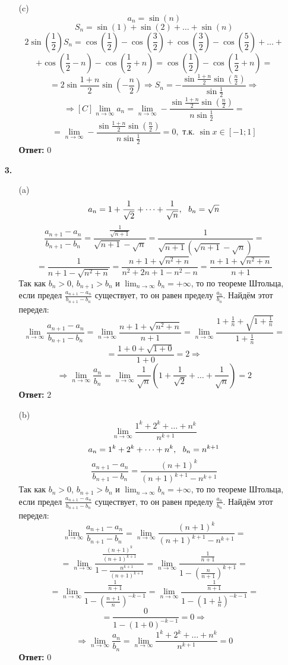 \documentclass[a4paper]{article}
\renewcommand{\f}[2]{\frac{#1}{#2}}
\newcommand{\ts}{\text{\space}}
\renewcommand{\r}{\Rightarrow}
\begin{document}
\begin{enumerate}
\begin{enumerate}
        \item[(c)]
        $$a_n = \sin(n)$$
        $$S_n = \sin(1) + \sin(2) + \dots + \sin(n)$$
        $$2\sin(\f{1}{2})S_n = \cos(\f{1}{2}) - \cos(\f{3}{2})+\cos(\f{3}{2})-\cos(\f{5}{2}) + \dots +$$
        $$+ \cos(\f{1}{2} - n) - \cos(\f{1}{2} + n) = \cos(\f{1}{2}) - \cos(\f{1}{2} + n) = $$
        $$= 2\sin{\f{1+n}{2}}\sin(-\f{n}{2}) \r S_n = -\f{\sin{\f{1+n}{2}}\sin(\f{n}{2})}{\sin{\f{1}{2}}}\r$$
        $$\r [C]\lim_{n \to \infty} a_n = \lim_{n \to \infty} -\f{\sin{\f{1+n}{2}}\sin(\f{n}{2})}{n\sin{\f{1}{2}}} = $$
        $$= \lim_{n \to \infty} -\f{\sin{\f{1+n}{2}}\sin(\f{n}{2})}{n\sin{\f{1}{2}}} = 0, \text{ т.к. $\sin{x} \in [-1;1]$}$$
        \textbf{Ответ: } $0$

    \end{enumerate}
    
    \item[\textbf{3.}]
    \begin{enumerate}
        \item[(a)]
        $$a_{n} = 1 + \f{1}{\sqrt{2}} + \dots + \f{1}{\sqrt{n}}, \ts \ts b_{n} = \sqrt{n}$$
        $$\f{a_{n+1}-a_{n}}{b_{n+1} - b_{n}} = \f{\f{1}{\sqrt{n+1}}}{\sqrt{n+1}-\sqrt{n}}=\f{1}{\sqrt{n+1}(\sqrt{n+1} - \sqrt{n})} = $$
        $$= \f{1}{n+1 - \sqrt{n^2+n}} = \f{n+1 + \sqrt{n^2+n}}{n^2+2n+1 - n^2-n}=\f{n+1 + \sqrt{n^2+n}}{n+1}$$
        Так как $b_n>0$, $b_{n+1}>b_n$ и $\lim_{n \to \infty}b_n = +\infty$, то по теореме Штольца, если предел $\f{a_{n+1}-a_{n}}{b_{n+1} - b_{n}}$ существует, то он равен пределу $\f{a_n}{b_n}$. Найдём этот передел:
        $$\lim_{n \to \infty}\f{a_{n+1}-a_{n}}{b_{n+1} - b_{n}} = \lim_{n \to \infty}\f{n+1 + \sqrt{n^2+n}}{n+1} = \lim_{n \to \infty}\f{1+\f{1}{n} + \sqrt{1+\f{1}{n}}}{1+\f{1}{n}} = $$
        $$= \f{1 + 0 + \sqrt{1 + 0}}{1 + 0} = 2 \r $$
        $$\r \lim_{n \to \infty}\f{a_n}{b_n} = \lim_{n \to \infty}\f{1}{\sqrt{n}}(1 + \f{1}{\sqrt{2}} + \dots + \f{1}{\sqrt{n}})= 2 $$
        \textbf{Ответ: } $2$

        \item[(b)]
        $$\lim_{n \to \infty} \f{1^k + 2^k + \dots + n^k}{n^{k+1}}$$
        $$a_n = 1^k + 2^k + \dots + n^k, \ts \ts b_n = n^{k+1}$$
        $$\f{a_{n+1}-a_{n}}{b_{n+1} - b_{n}} = \f{(n+1)^k}{(n+1)^{k+1} - n^{k+1}}$$
        Так как $b_n>0$, $b_{n+1}>b_n$ и $\lim_{n \to \infty}b_n = +\infty$, то по теореме Штольца, если предел $\f{a_{n+1}-a_{n}}{b_{n+1} - b_{n}}$ существует, то он равен пределу $\f{a_n}{b_n}$. Найдём этот передел:
        $$\lim_{n \to \infty}\f{a_{n+1}-a_{n}}{b_{n+1} - b_{n}} = \lim_{n \to \infty}\f{(n+1)^k}{(n+1)^{k+1} - n^{k+1}} = $$
        $$= \lim_{n \to \infty}\f{\f{(n+1)^k}{(n+1)^{k+1}}}{1 - \f{n^{k+1}}{(n+1)^{k+1}}} = \lim_{n \to \infty}\f{\f{1}{n+1}}{1 - (\f{n}{n+1})^{k+1}} = $$
        $$= \lim_{n \to \infty}\f{\f{1}{n+1}}{1 - (\f{n+1}{n})^{-k-1}} = \lim_{n \to \infty}\f{\f{1}{n+1}}{1 - (1 + \f{1}{n})^{-k-1}} = $$
        $$= \f{0}{1 - (1+0)^{-k-1}} = 0 \r$$
        $$\r \lim_{n \to \infty}\f{a_n}{b_n} = \lim_{n \to \infty} \f{1^k + 2^k + \dots + n^k}{n^{k+1}} = 0$$
        \textbf{Ответ:} $0$


\end{enumerate}
\end{enumerate}
\end{document}
